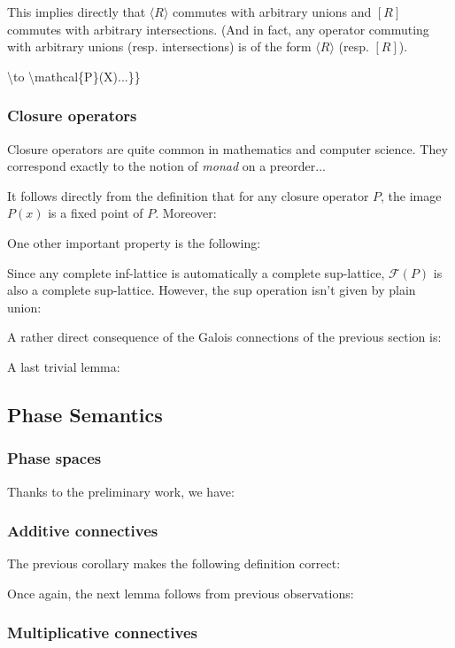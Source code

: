This implies directly that \(\langle R\rangle\) commutes with arbitrary
unions and \([R]\) commutes with arbitrary intersections. (And in fact,
any operator commuting with arbitrary unions (resp. intersections) is of
the form \(\langle R\rangle\) (resp. \([R]\)).

\textbackslash{}to \textbackslash{}mathcal\{P\}(X)...\}\}

\subsubsection{Closure operators}\label{closure-operators}

Closure operators are quite common in mathematics and computer science.
They correspond exactly to the notion of \emph{monad} on a preorder...

It follows directly from the definition that for any closure operator
\(P\), the image \(P(x)\) is a fixed point of \(P\). Moreover:

One other important property is the following:

Since any complete inf-lattice is automatically a complete sup-lattice,
\(\mathcal{F}(P)\) is also a complete sup-lattice. However, the sup
operation isn't given by plain union:

A rather direct consequence of the Galois connections of the previous
section is:

A last trivial lemma:

\subsection{Phase Semantics}\label{phase-semantics-1}

\subsubsection{Phase spaces}\label{phase-spaces}

Thanks to the preliminary work, we have:

\subsubsection{Additive connectives}\label{additive-connectives}

The previous corollary makes the following definition correct:

Once again, the next lemma follows from previous observations:

\subsubsection{Multiplicative
connectives}\label{multiplicative-connectives}

